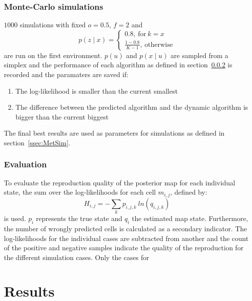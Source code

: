\documentclass[twocolumn,letterpaper]{IEEEAerospaceCLS}  %
\begin{document}
\subsubsection{Monte-Carlo simulations} \label{ssec:MetMC}
$1000$ simulations with fixed $o=0.5$, $f=2$ and
\begin{equation}
    p(z\mid x)=
    \begin{cases}
        0.8,~\text{for}~k=x \\
        \frac{1-0.8}{K-1},~\text{otherwise}
    \end{cases}
\end{equation}
are run on the first environment. $p(u)$ and $p(x\mid u)$ are sampled from a simplex and the performance of each algorithm as defined in section~\ref{ssec:MetEval} is recorded and the paramaters are saved if:
\begin{enumerate}
    \item The log-likelihood is smaller than the current smallest
    \item The difference between the predicted algorithm and the dynamic algorithm is bigger than the current biggest
\end{enumerate}
The final best results are used as parameters for simulations as defined in section~\ref{ssec:MetSim}.
\subsubsection{Evaluation}\label{ssec:MetEval}
To evaluate the reproduction quality of the posterior map for each individual state, the sum over the log-likelihoods for each cell $m_{i,j}$, defined by:
\begin{equation} \label{eq:Entropy}
    H_{i,j} = - \sum_{k} p_{i,j,k}~ln(q_{i,j,k})
\end{equation}
is used. $p_i$ represents the true state and $q_i$ the estimated map state. Furthermore, the number of wrongly predicted cells is calculated as a secondary indicator.
The log-likelihoods for the individual cases are subtracted from another and the count of the positive and negative samples indicate the quality of the reproduction for the different simulation cases. Only the cases for 
\section{Results} \label{sec:Res}
\end{document}

